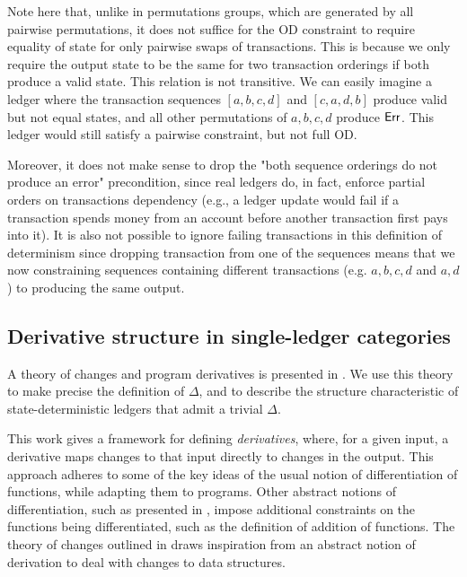 Note here that, unlike in permutations groups, which are generated by all pairwise
permutations, it does not suffice for the OD constraint to require equality of
state for only pairwise swaps of transactions. This is because we only require
the output state to be the same for two transaction orderings if both produce
a valid state. This relation is not transitive. We can easily imagine a ledger
where the transaction sequences $[a, b, c, d]$  and $[c, a, d, b]$ produce
valid but not equal states, and all other permutations of $a, b, c, d$ produce
$\mathsf{Err}$. This ledger would still satisfy a pairwise constraint, but not
full OD.

Moreover, it does not make sense to drop the "both sequence orderings do not produce
an error" precondition, since real ledgers do, in fact, enforce partial orders
on transactions dependency (e.g., a ledger update would fail if a transaction spends
money from an account before another transaction first pays into it). It is also not
possible to ignore failing transactions in this definition of determinism since
dropping transaction from one of the sequences means that we now constraining
sequences containing different transactions (e.g. $a, b, c, d$ and $a, d$) to
producing the same output.



\subsection{Derivative structure in single-ledger categories}

A theory of changes and program derivatives
is presented in \cite{changes}. We use this theory to make precise the definition of $\Delta$,
and to describe the structure characteristic
of state-deterministic ledgers that admit a trivial $\Delta$.

This work gives a framework for defining \emph{derivatives}, where, for a given input,
a derivative maps changes to that input directly to changes in the output.
This approach adheres to some of the key ideas of the usual notion of differentiation
of functions, while adapting them to programs. Other abstract notions of differentiation,
such as presented in \cite{diffrestcats}, impose additional constraints on
the functions being differentiated, such as the definition of addition of functions.
The theory of changes outlined in \cite{changes} draws inspiration from an
abstract notion of derivation to deal with changes to data structures.

